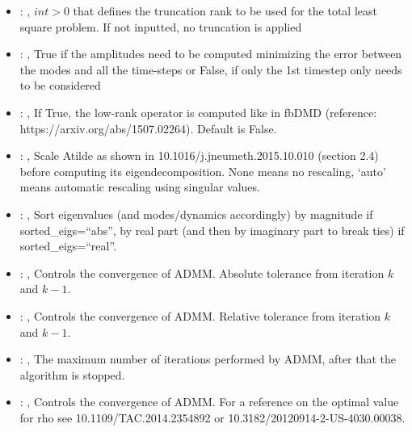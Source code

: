 \begin{itemize}
    \item {}: , 
      $int > 0$ that defines the truncation rank to be used for the total
      least square problem. If not inputted, no truncation is applied

    \item {}: , 
      True if the amplitudes need to be computed minimizing the error
      between the modes and all the time-steps or False, if only the 1st timestep only needs to be
      considered

    \item {}: , 
      If True, the low-rank operator is computed like in fbDMD (reference:
      https://arxiv.org/abs/1507.02264).                                                  Default is
      False.

    \item {}: , 
      Scale Atilde as shown in 10.1016/j.jneumeth.2015.10.010 (section 2.4) before computing its
      eigendecomposition. None means no rescaling, ‘auto’ means automatic rescaling using singular
      values.

    \item {}: , 
      Sort eigenvalues (and modes/dynamics accordingly) by magnitude if sorted\_eigs=``abs'',
      by real part (and then by imaginary part to break ties) if sorted\_eigs=``real''.

    \item {}: , 
      Controls the convergence of ADMM. Absolute tolerance from iteration $k$ and $k-1$.

    \item {}: , 
      Controls the convergence of ADMM. Relative tolerance from iteration $k$ and $k-1$.

    \item {}: , 
      The maximum number of iterations performed by ADMM, after that the algorithm is stopped.

    \item {}: , 
      Controls the convergence of ADMM. For a reference on the optimal value for rho see
      10.1109/TAC.2014.2354892 or 10.3182/20120914-2-US-4030.00038.


\end{itemize}
